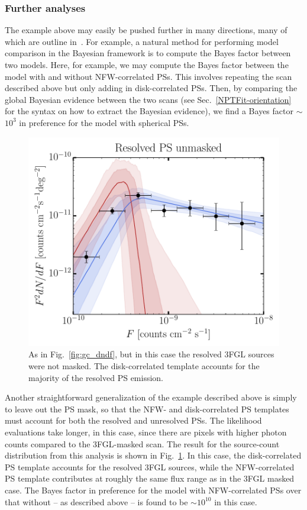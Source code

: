 \subsubsection{Further analyses}

The example above may easily be pushed further in many directions, many of which are outline in~\cite{Lee:2015fea}.  For example, a natural method for performing model comparison in the Bayesian framework is to compute the Bayes factor between two models.  Here, for example, we may compute the Bayes factor between the model with and without NFW-correlated PSs.  This involves repeating the scan described above but only adding in disk-correlated PSs.  Then, by comparing the global Bayesian evidence between the two scans (see Sec.~\ref{NPTFit-orientation} for the syntax on how to extract the Bayesian evidence), we find a Bayes factor $\sim$$10^3$ in preference for the model with spherical PSs.

\begin{figure}[htb]
\leavevmode
\begin{center}
\includegraphics[width=.49\textwidth]{ch-nptfit/dnds_unmasked.pdf}
\end{center}
\vspace{-.50cm}
\caption{As in Fig.~\ref{fig:gc_dndf}, but in this case the resolved 3FGL sources were not masked.  The disk-correlated template accounts for the majority of the resolved PS emission. }
\label{dNdF: unmasked}
\end{figure}   

Another straightforward generalization of the example described above is simply to leave out the PS mask, so that the NFW- and disk-correlated PS templates must account for both the resolved and unresolved PSs.  The likelihood evaluations take longer, in this case, since there are pixels with higher photon counts compared to the 3FGL-masked scan.  The result for the source-count distribution from this analysis is shown in Fig.~\ref{dNdF: unmasked}.  In this case, the disk-correlated PS template accounts for the resolved 3FGL sources, while the NFW-correlated PS template contributes at roughly the same flux range as in the 3FGL masked case.  The Bayes factor in preference for the model with NFW-correlated PSs over that without -- as described above -- is found to be $\sim$$10^{10}$ in this case.


